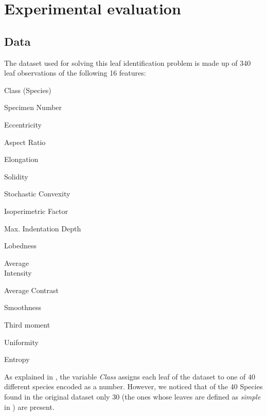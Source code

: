 \documentclass{article}
\begin{document}
\section{Experimental evaluation}

\subsection{Data}\label{dat}
The dataset used for solving this leaf identification problem is made up of 340 leaf observations of the following 16 features:
\begin{multicols}{4}
	\begin{enumerate}
		
		\footnotesize{\item Class (Species)}
		\footnotesize{\item Specimen Number}
		\footnotesize{\item Eccentricity}
		\footnotesize{\item Aspect Ratio}
		
		\columnbreak
		
		\footnotesize{\item Elongation}
		\footnotesize{\item Solidity}
		\footnotesize {\item Stochastic Convexity}
		\footnotesize{\item Isoperimetric Factor}
		
		\columnbreak
		
		\footnotesize{\item Max. Indentation Depth}
		\footnotesize{\item Lobedness}
		\footnotesize{\item Average\\ Intensity}
		\footnotesize{\item Average Contrast}
		
		\columnbreak
		
		\footnotesize{\item Smoothness}
		\footnotesize{\item Third moment}
		\footnotesize{\item Uniformity}
		\footnotesize{\item Entropy}
	\end{enumerate}
\end{multicols}
\noindent As explained in \cite{silva}, the variable \textit{Class}  assigns each leaf of the dataset to one of $40$ different species encoded as a number. However, we noticed that  of the 40 Species found in the original dataset only 30 (the ones whose leaves are defined as \textit{simple} in \cite{silva}) are present.
\end{document}
